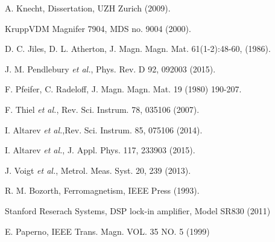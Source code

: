 \documentclass[review]{elsarticle}
\begin{document}
\begin{thebibliography}{00}
 A. Knecht, Dissertation, UZH Zurich (2009).

 KruppVDM Magnifer 7904, MDS no. 9004 (2000).

 D. C. Jiles, D. L. Atherton,  J. Magn. Magn. Mat. 61(1-2):48-60, (1986).

 J. M. Pendlebury {\it et al.}, Phys. Rev. D 92, 092003 (2015).

 F. Pfeifer, C. Radeloff, J. Magn. Magn. Mat. 19 (1980) 190-207.

 F. Thiel {\it et al.}, Rev. Sci. Instrum. 78, 035106 (2007).

 I. Altarev {\it et al.},Rev. Sci. Instrum. 85, 075106 (2014).

 I. Altarev {\it et al.}, J. Appl. Phys. 117, 233903 (2015).

 J. Voigt {\it et al.}, Metrol. Meas. Syst. 20, 239 (2013).

 R. M. Bozorth, Ferromagnetism, IEEE Press (1993).

 Stanford Reserach Systems, DSP lock-in amplifier, Model SR830 (2011)

 E. Paperno, IEEE Trans. Magn. VOL. 35 NO. 5 (1999)
\end{thebibliography}
\end{document}
